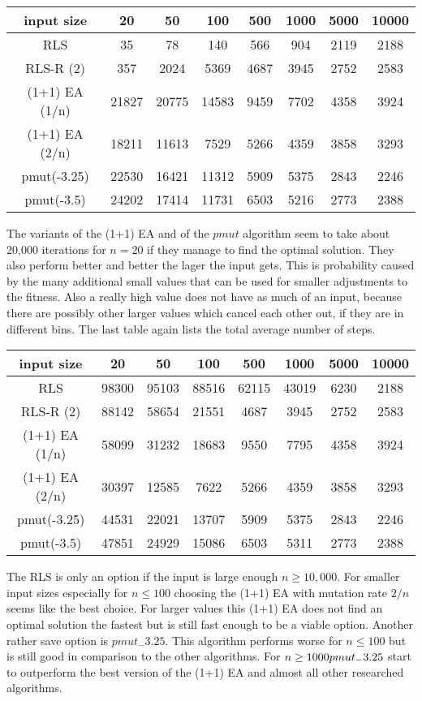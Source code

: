 \begin{tabular}{cccccccc}
      input size    & 20    & 50    & 100   & 500  & 1000 & 5000 & 10000 \\\hline
      RLS           & 35    & 78    & 140   & 566  & 904  & 2119 & 2188  \\
      RLS-R (2)      & 357   & 2024  & 5369  & 4687 & 3945 & 2752 & 2583  \\
      (1+1) EA (1/n) & 21827 & 20775 & 14583 & 9459 & 7702 & 4358 & 3924  \\
      (1+1) EA (2/n) & 18211 & 11613 & 7529  & 5266 & 4359 & 3858 & 3293  \\
      pmut(-3.25)   & 22530 & 16421 & 11312 & 5909 & 5375 & 2843 & 2246  \\
      pmut(-3.5)    & 24202 & 17414 & 11731 & 6503 & 5216 & 2773 & 2388  \\
\end{tabular}

The variants of the (1+1) EA and of the $pmut$ algorithm seem to take about 20,000 iterations for $n=20$ if they manage to find the optimal solution.
They also perform better and better the lager the input gets.
This is probability caused by the many additional small values that can be used for smaller adjustments to the fitness.
Also a really high value does not have as much of an input, because there are possibly other larger values which cancel each other out, if they are in different bins.
The last table again lists the total average number of steps.

\begin{tabular}{cccccccc}
      input size    & 20    & 50    & 100   & 500   & 1000  & 5000 & 10000 \\\hline
      RLS           & 98300 & 95103 & 88516 & 62115 & 43019 & 6230 & 2188  \\
      RLS-R (2)      & 88142 & 58654 & 21551 & 4687  & 3945  & 2752 & 2583  \\
      (1+1) EA (1/n) & 58099 & 31232 & 18683 & 9550  & 7795  & 4358 & 3924  \\
      (1+1) EA (2/n) & 30397 & 12585 & 7622  & 5266  & 4359  & 3858 & 3293  \\
      pmut(-3.25)   & 44531 & 22021 & 13707 & 5909  & 5375  & 2843 & 2246  \\
      pmut(-3.5)    & 47851 & 24929 & 15086 & 6503  & 5311  & 2773 & 2388  \\
\end{tabular}

The RLS is only an option if the input is large enough $n \ge 10,000$. For smaller input sizes especially for $n \le 100$ choosing the (1+1) EA with mutation rate $2/n$ seems like the best choice. For larger values this (1+1) EA does not find an optimal solution the fastest but is still fast enough to be a viable option. Another rather save option is $pmut_-3.25$. This algorithm performs worse for $n \le 100$ but is still good in comparison to the other algorithms. For $n \ge 1000 \space pmut_-3.25$ start to outperform the best version of the (1+1) EA and almost all other researched algorithms.